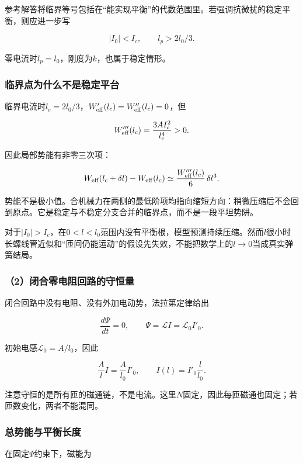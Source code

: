 \documentclass[12pt,a4paper,fontset=fandol]{ctexart}
\begin{document}
参考解答将临界等号包括在``能实现平衡''的代数范围里。若强调抗微扰的稳定平衡，则应进一步写

\[
\boxed{|I_0|<I_c,\qquad l_p>2l_0/3}.
\]

零电流时\(l_p=l_0\)，刚度为\(k\)，也属于稳定情形。

\subsubsection{临界点为什么不是稳定平台}\label{ux4e34ux754cux70b9ux4e3aux4ec0ux4e48ux4e0dux662fux7a33ux5b9aux5e73ux53f0}

临界电流时\(l_c=2l_0/3\)，\(W'_{\rm eff}(l_c)=W''_{\rm eff}(l_c)=0\)，但

\[
W'''_{\rm eff}(l_c)
=\frac{3AI_c^2}{l_c^4}>0.
\]

因此局部势能有非零三次项：

\[
W_{\rm eff}(l_c+\delta l)
-W_{\rm eff}(l_c)
\simeq\frac{W'''_{\rm eff}(l_c)}6\,\delta l^3.
\]

势能不是极小值。合机械力在两侧的最低阶项均指向缩短方向：稍微压缩后不会回到原点。它是稳定与不稳定分支合并的临界点，而不是一段平坦势阱。

对于\(|I_0|>I_c\)，在\(0<l<l_0\)范围内没有平衡根，模型预测持续压缩。然而\(l\)很小时长螺线管近似和``匝间仍能运动''的假设先失效，不能把数学上的\(l\to0\)当成真实弹簧结局。

\subsubsection{（2）闭合零电阻回路的守恒量}\label{ux95edux5408ux96f6ux7535ux963bux56deux8defux7684ux5b88ux6052ux91cf}

闭合回路中没有电阻、没有外加电动势，法拉第定律给出

\[
\frac{d\Psi}{dt}=0,
\qquad \Psi=\mathcal LI=\mathcal L_0I'_0.
\]

初始电感\(\mathcal L_0=A/l_0\)，因此

\[
\frac Al I=\frac A{l_0}I'_0,
\qquad \boxed{I(l)=I'_0\frac l{l_0}}.
\]

注意守恒的是所有匝的磁通链，不是电流。这里\(N\)固定，因此每匝磁通也固定；若匝数变化，两者不能混同。

\subsubsection{总势能与平衡长度}\label{ux603bux52bfux80fdux4e0eux5e73ux8861ux957fux5ea6}

在固定\(\Psi\)约束下，磁能为
\end{document}
